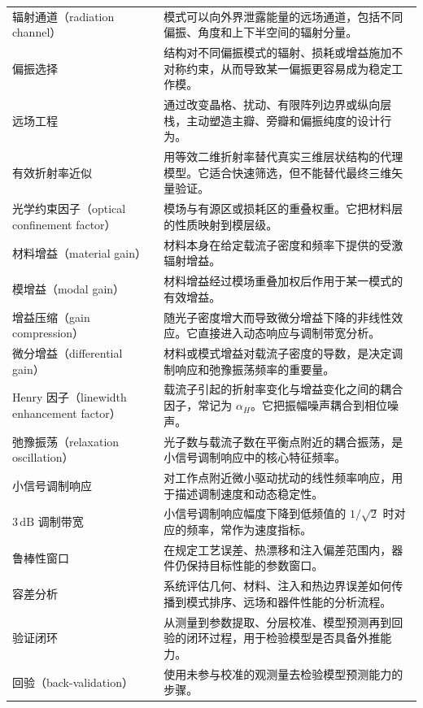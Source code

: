 \begin{longtable}{@{}p{}p{}@{}}
辐射通道（radiation channel） & 模式可以向外界泄露能量的远场通道，包括不同偏振、角度和上下半空间的辐射分量。 \\
偏振选择 & 结构对不同偏振模式的辐射、损耗或增益施加不对称约束，从而导致某一偏振更容易成为稳定工作模。 \\
远场工程 & 通过改变晶格、扰动、有限阵列边界或纵向层栈，主动塑造主瓣、旁瓣和偏振纯度的设计行为。 \\
有效折射率近似 & 用等效二维折射率替代真实三维层状结构的代理模型。它适合快速筛选，但不能替代最终三维矢量验证。 \\
光学约束因子（optical confinement factor） & 模场与有源区或损耗区的重叠权重。它把材料层的性质映射到模层级。 \\
材料增益（material gain） & 材料本身在给定载流子密度和频率下提供的受激辐射增益。 \\
模增益（modal gain） & 材料增益经过模场重叠加权后作用于某一模式的有效增益。 \\
增益压缩（gain compression） & 随光子密度增大而导致微分增益下降的非线性效应。它直接进入动态响应与调制带宽分析。 \\
微分增益（differential gain） & 材料或模式增益对载流子密度的导数，是决定调制响应和弛豫振荡频率的重要量。 \\
Henry 因子（linewidth enhancement factor） & 载流子引起的折射率变化与增益变化之间的耦合因子，常记为 $\alpha_H$。它把振幅噪声耦合到相位噪声。 \\
弛豫振荡（relaxation oscillation） & 光子数与载流子数在平衡点附近的耦合振荡，是小信号调制响应中的核心特征频率。 \\
小信号调制响应 & 对工作点附近微小驱动扰动的线性频率响应，用于描述调制速度和动态稳定性。 \\
$3\,\mathrm{dB}$ 调制带宽 & 小信号调制响应幅度下降到低频值的 $1/\sqrt{2}$ 时对应的频率，常作为速度指标。 \\
鲁棒性窗口 & 在规定工艺误差、热漂移和注入偏差范围内，器件仍保持目标性能的参数窗口。 \\
容差分析 & 系统评估几何、材料、注入和热边界误差如何传播到模式排序、远场和器件性能的分析流程。 \\
验证闭环 & 从测量到参数提取、分层校准、模型预测再到回验的闭环过程，用于检验模型是否具备外推能力。 \\
回验（back-validation） & 使用未参与校准的观测量去检验模型预测能力的步骤。 \\
\bottomrule
\end{longtable}


